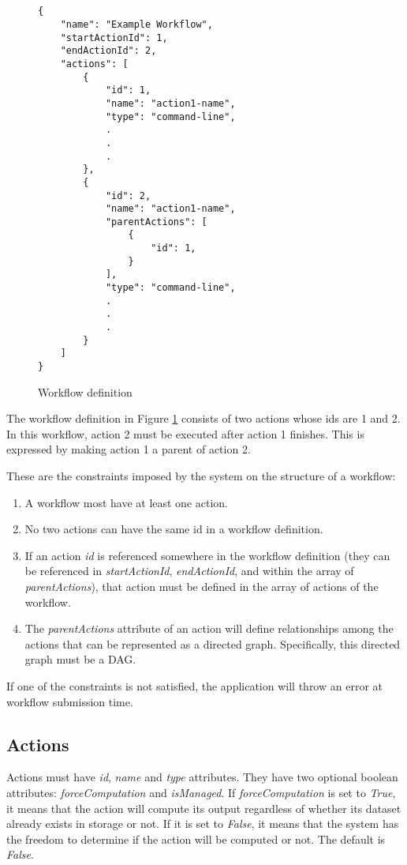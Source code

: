 \begin{figure}
\begin{mdframed}
\begin{singlespace}
\begin{verbatim}


{
    "name": "Example Workflow",
    "startActionId": 1,
    "endActionId": 2,
    "actions": [
        {
            "id": 1,
            "name": "action1-name",
            "type": "command-line",
            .
            .
            .
        },
        {
            "id": 2,
            "name": "action1-name",
            "parentActions": [
                { 
                    "id": 1,
                }
            ],
            "type": "command-line",
            .
            .
            .
        }
    ]
}
\end{verbatim}
\end{singlespace}
\end{mdframed}
\caption{Workflow definition}
\label{fig:workflow_definition_language}
\end{figure}

The workflow definition in Figure \ref{fig:workflow_definition_language} consists of two actions whose ids are 1 and 2. In this workflow, action 2 must be executed after action 1 finishes. This is expressed by making action 1 a parent of action 2. 

These are the constraints imposed by the system on the structure of a workflow:
\begin{enumerate}
\item A workflow most have at least one action.
\item No two actions can have the same id in a workflow definition.
\item If an action \textit{id} is referenced somewhere in the workflow definition (they can be referenced in \textit{startActionId}, \textit{endActionId}, and within the array of \textit{parentActions}), that action must be defined in the array of actions of the workflow.
\item The \textit{parentActions} attribute of an action will define relationships among the actions that can be represented as a directed graph. Specifically, this directed graph must be a DAG.
\end{enumerate}

If one of the constraints is not satisfied, the application will throw an error at workflow submission time.

\subsection{Actions}
Actions must have \textit{id}, \textit{name} and \textit{type} attributes. They have two optional boolean attributes: \textit{forceComputation} and \textit{isManaged}. If \textit{forceComputation} is set to \textit{True}, it means that the action will compute its output regardless of whether its dataset already exists in storage or not. If it is set to \textit{False}, it means that the system has the freedom to determine if the action will be computed or not. The default is \textit{False}.

